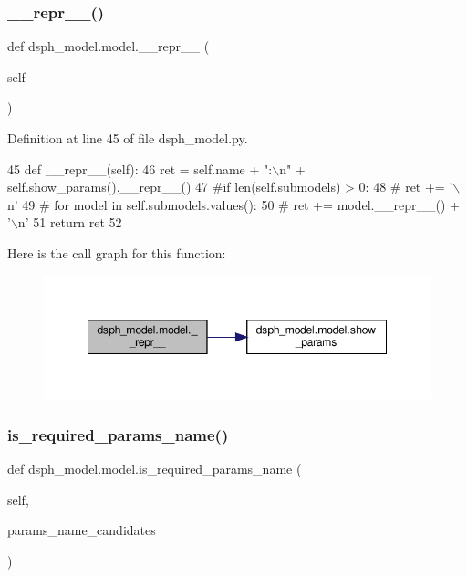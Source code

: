 \subsubsection{\texorpdfstring{\+\_\+\+\_\+repr\+\_\+\+\_\+()}{\_\_repr\_\_()}}
{\footnotesize\ttfamily def dsph\+\_\+model.\+model.\+\_\+\+\_\+repr\+\_\+\+\_\+ (\begin{DoxyParamCaption}\item[{}]{self }\end{DoxyParamCaption})}



Definition at line 45 of file dsph\+\_\+model.\+py.


\begin{DoxyCode}
45     \textcolor{keyword}{def }\_\_repr\_\_(self):
46         ret = self.name + \textcolor{stringliteral}{":\(\backslash\)n"} + self.show\_params().\_\_repr\_\_()
47         \textcolor{comment}{#if len(self.submodels) > 0:}
48         \textcolor{comment}{#    ret += '\(\backslash\)n'}
49         \textcolor{comment}{#    for model in self.submodels.values():}
50         \textcolor{comment}{#        ret += model.\_\_repr\_\_() + '\(\backslash\)n'}
51         \textcolor{keywordflow}{return} ret
52 
\end{DoxyCode}
Here is the call graph for this function\+:\nopagebreak
\begin{figure}[H]
\begin{center}
\leavevmode
\includegraphics[width=348pt]{d3/da3/classdsph__model_1_1model_a5445148b72ecd03858f543cb7c9c2c6f_cgraph}
\end{center}
\end{figure}
\mbox{\label{classdsph__model_1_1model_a9826d4256eb05869703fb1a989503ecc}} 
\subsubsection{\texorpdfstring{is\+\_\+required\+\_\+params\+\_\+name()}{is\_required\_params\_name()}}
{\footnotesize\ttfamily def dsph\+\_\+model.\+model.\+is\+\_\+required\+\_\+params\+\_\+name (\begin{DoxyParamCaption}\item[{}]{self,  }\item[{}]{params\+\_\+name\+\_\+candidates }\end{DoxyParamCaption})}



